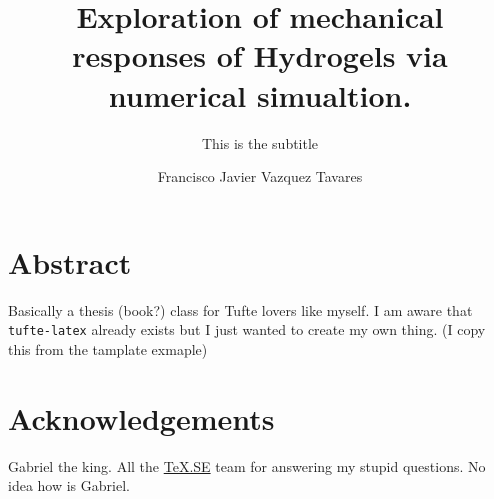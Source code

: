 \documentclass[12pt,colorful,boxey]{tufte-style-thesis}
\author{Francisco Javier Vazquez Tavares}
\title{Exploration of mechanical responses of Hydrogels via numerical simualtion.}
\subtitle{This is the subtitle}
\begin{document}
\maketitle

\justifying   

\chapter*{Abstract}
Basically a thesis (book?) class for Tufte lovers like myself. 
I am aware that \texttt{tufte-latex} already exists but I just wanted to create my own thing.
(I copy this from the tamplate exmaple)

\chapter*{Acknowledgements}
Gabriel the king. 
All the \href{https://tex.stackexchange.com/}{\TeX.SE} team for answering my stupid questions.
No idea how is Gabriel.

\tableofcontents
\listoffigures
\listoftables
\listoflistings


\mainmatter



\end{document}
